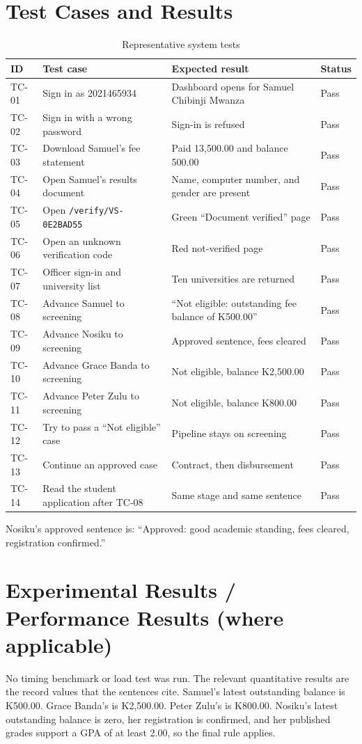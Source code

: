 \documentclass[12pt,a4paper]{report}
\begin{document}
\section{Test Cases and Results}
\begin{table}[H]
\centering
\caption{Representative system tests}
\label{tab:tests}
\begin{tabular}{p{}p{}p{}p{}}
\toprule
ID & Test case & Expected result & Status\\
\midrule
TC-01 & Sign in as 2021465934 & Dashboard opens for Samuel Chibinji Mwanza & Pass\\
TC-02 & Sign in with a wrong password & Sign-in is refused & Pass\\
TC-03 & Download Samuel's fee statement & Paid 13,500.00 and balance 500.00 & Pass\\
TC-04 & Open Samuel's results document & Name, computer number, and gender are present & Pass\\
TC-05 & Open \texttt{/verify/VS-0E2BAD55} & Green ``Document verified'' page & Pass\\
TC-06 & Open an unknown verification code & Red not-verified page & Pass\\
TC-07 & Officer sign-in and university list & Ten universities are returned & Pass\\
TC-08 & Advance Samuel to screening & ``Not eligible: outstanding fee balance of K500.00'' & Pass\\
TC-09 & Advance Nosiku to screening & Approved sentence, fees cleared & Pass\\
TC-10 & Advance Grace Banda to screening & Not eligible, balance K2,500.00 & Pass\\
TC-11 & Advance Peter Zulu to screening & Not eligible, balance K800.00 & Pass\\
TC-12 & Try to pass a ``Not eligible'' case & Pipeline stays on screening & Pass\\
TC-13 & Continue an approved case & Contract, then disbursement & Pass\\
TC-14 & Read the student application after TC-08 & Same stage and same sentence & Pass\\
\bottomrule
\end{tabular}
\end{table}

Nosiku's approved sentence is: ``Approved: good academic standing, fees cleared, registration confirmed.''

\section{Experimental Results / Performance Results (where applicable)}
No timing benchmark or load test was run. The relevant quantitative results are the record values that the sentences cite. Samuel's latest outstanding balance is K500.00. Grace Banda's is K2,500.00. Peter Zulu's is K800.00. Nosiku's latest outstanding balance is zero, her registration is confirmed, and her published grades support a GPA of at least 2.00, so the final rule applies.
\end{document}
